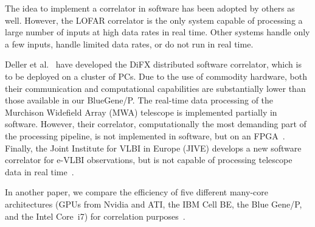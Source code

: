 \documentclass{sig-alternate}
\begin{document}

The idea to implement a correlator in software has been adopted by others as
well.
However, the LOFAR correlator is the only system capable of processing a large
number of inputs at high data rates in real time.
Other systems handle only a few inputs, handle limited data rates, or do not
run in real time.

Deller et al.~\cite{Deller:07} have developed the DiFX distributed
software correlator, which is to be deployed on a cluster of PCs.
Due to the use of commodity hardware, both their communication and
computational capabilities are substantially lower than those available in
our BlueGene/P.
The real-time data processing of the Murchison Widefield Array (MWA) telescope
is implemented partially in software.
However, their correlator, computationally the most demanding part of the
processing pipeline, is not implemented in software, but on an
FPGA~\cite{Ord:08}.
Finally, the Joint Institute for VLBI in Europe (JIVE) develops a new software
correlator for e-VLBI observations, but is not capable of processing telescope
data in real time~\cite{Kruithof:08}.

In another paper, we compare the efficiency of five different many-core
architectures (GPUs from Nvidia and ATI, the IBM Cell BE, the Blue Gene/P,
and the Intel Core~i7) for correlation purposes~\cite{Nieuwpoort:09}.


\end{document}
